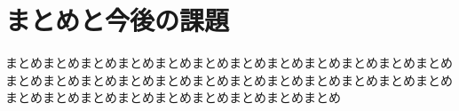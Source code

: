 

\section{まとめと今後の課題} %
\label{sec:まとめと今後の課題}
  まとめまとめまとめまとめまとめまとめまとめまとめまとめまとめまとめまとめまとめまとめまとめまとめまとめまとめまとめまとめまとめまとめまとめまとめまとめまとめまとめまとめまとめまとめまとめまとめまとめ


